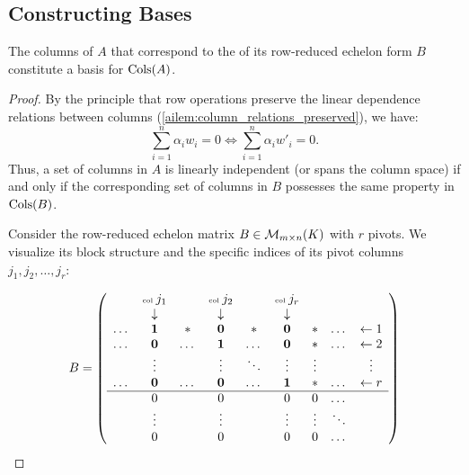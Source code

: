 \subsection{Constructing Bases}

\begin{theorem}
\label{thm:basis_col_space}
The columns of $A$ that correspond to the  of its row-reduced echelon form $B$ constitute a basis for $\operatorname{Cols}(A)$.
\end{theorem}

\begin{proof}
By the principle that row operations preserve the linear dependence relations between columns (\cref{ailem:column_relations_preserved}), we have:
\[
\sum_{i=1}^n \alpha_i w_i = 0 \iff \sum_{i=1}^n \alpha_i w'_i = 0.
\]
Thus, a set of columns in $A$ is linearly independent (or spans the column space) if and only if the corresponding set of columns in $B$ possesses the same property in $\operatorname{Cols}(B)$.

Consider the row-reduced echelon matrix $B \in \mathcal{M}_{m \times n}(K)$ with $r$ pivots. We visualize its block structure and the specific indices of its pivot columns $j_1, j_2, \dots, j_r$:

\begin{equation}
\label{eq:matrix_B_rigorous}
B = \left( 
\begin{array}{ccccccccc}
 & \text{\tiny col } j_1 & & \text{\tiny col } j_2 & & \text{\tiny col } j_r & & & \\
 & \downarrow & & \downarrow & & \downarrow & & & \\
\dots & \mathbf{1} & * & \mathbf{0} & * & \mathbf{0} & * & \dots & \leftarrow 1 \\
\dots & \mathbf{0} & \dots & \mathbf{1} & \dots & \mathbf{0} & * & \dots & \leftarrow 2 \\
 & \vdots & & \vdots & \ddots & \vdots & \vdots & & \vdots \\
\dots & \mathbf{0} & \dots & \mathbf{0} & \dots & \mathbf{1} & * & \dots & \leftarrow r \\ \hline
 & 0 & & 0 & & 0 & 0 & \dots & \\
 & \vdots & & \vdots & & \vdots & \vdots & \ddots & \\
 & 0 & & 0 & & 0 & 0 & \dots & 
\end{array} 
\right)
\end{equation}


\end{proof}
